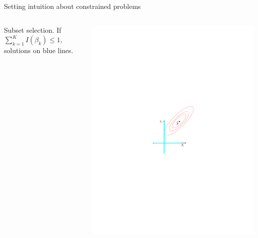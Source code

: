 \documentclass[mathserif, aspectratio=169]{beamer}
\begin{document}
\begin{frame}{Setting intuition about constrained problems}
\begin{columns}
\pause
{}
\begin{center}
Subset selection.  If $\sum_{k=1}^K I(\beta_k) \le 1$, solutions on blue lines.
\end{center}
\includegraphics[scale=0.65]{RSE_subset_constr}


\end{columns}
\end{frame}
\end{document}
